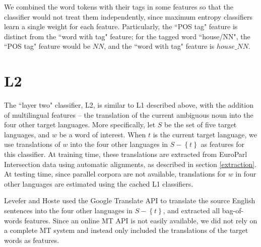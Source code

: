 \documentclass[11pt,letterpaper]{article}
\begin{document}
We combined the word tokens with their tags in some features so that the
classifier would not treat them independently, since maximum entropy
classifiers learn a single weight for each feature.
Particularly, the ``POS tag" feature is distinct from the ``word with tag"
feature; for the tagged word ``house/NN", the ``POS tag" feature would be $NN$, and
the ``word with tag" feature is $house\_NN$. 

\section{L2}

The ``layer two" classifier, L2, is similar to L1 described above, with the
addition of multilingual features -- the translation of the current ambiguous
noun into the four other target languages.  More specifically, let $S$ be the
set of five target languages, and $w$ be a word of interest. When $t$ is the
current target language, we use translations of $w$ into the four other
languages in $ S - \left\lbrace t \right\rbrace $ as features for this
classifier. At training time, these translations are  extracted from EuroParl
Intersection data using automatic alignments, as described in section
\ref{extraction}. At testing time, since parallel corpora are not available,
translations for $w$ in four other languages are estimated using the cached L1
classifiers.

Levefer and Hoste  used the
Google Translate API to translate the source English sentences into the four
other languages in $ S - \left\lbrace t \right\rbrace$, and extracted all
bag-of-words features. Since an online MT API is not easily available, we did
not rely on a complete MT system and instead only included the translations of
the target words as features.



\end{document}
